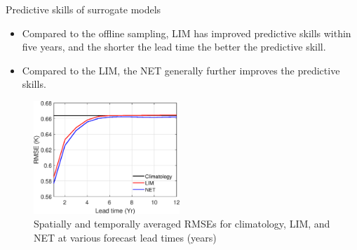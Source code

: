 \documentclass[final]{beamer}
\newlength{\colwidth}
\begin{document}
\begin{frame}[t]
\begin{columns}[t]
\begin{column}{\colwidth}
    			\begin{alertblock}{Predictive skills of surrogate models}
                    \begin{itemize}
                        \item Compared to the offline sampling, LIM has improved predictive skills within five years, and the shorter the lead time the better the predictive skill.
                        \item Compared to the LIM, the NET generally further improves the predictive skills.
                    \end{itemize}
                    \begin{figure}
                        \begin{minipage}[t]{0.8\textwidth}
                            \centerline{\includegraphics[width=0.49\textwidth]{figure/Figure3.eps}}
                            \caption{Spatially and temporally averaged RMSEs for climatology, LIM, and NET at various forecast lead times (years)}\label{fig3}
                        \end{minipage}
                    \end{figure}	
    			\end{alertblock}
    

\end{column}
\end{columns}
\end{frame}
\end{document}
